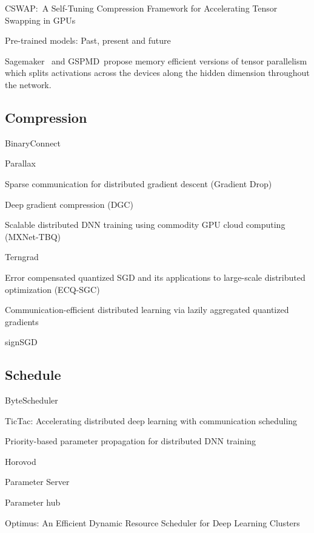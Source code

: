 CSWAP:\ A Self-Tuning Compression Framework for Accelerating Tensor Swapping in GPUs~\cite{chen2021cswap}

Pre-trained models: Past, present and future~\cite{han2021pre}

Sagemaker~\cite{karakus2021amazon} and GSPMD~\cite{xu2021gspmd}propose memory efficient versions of tensor parallelism which splits activations across the devices along the hidden dimension throughout the network.





\subsection{Compression}
BinaryConnect~\cite{courbariaux2015binaryconnect}

Parallax~\cite{kim2019parallax}

Sparse communication for distributed gradient descent (Gradient Drop)~\cite{aji2017sparse}

Deep gradient compression (DGC)~\cite{lin2017deep}

Scalable distributed DNN training using commodity GPU cloud computing (MXNet-TBQ)~\cite{strom2015scalable}

Terngrad~\cite{wen2017terngrad}

Error compensated quantized SGD and its applications to large-scale distributed optimization (ECQ-SGC)~\cite{wu2018error}

Communication-efficient distributed learning via lazily aggregated quantized gradients~\cite{sun2019communication}

signSGD~\cite{bernstein2018signsgd}

\subsection{Schedule}

ByteScheduler~\cite{peng2019bytescheduler}

TicTac: Accelerating distributed deep learning with communication scheduling~\cite{hashemi2018tictac}

Priority-based parameter propagation for distributed DNN training~\cite{jayarajan2019priority}

Horovod~\cite{horovod}

Parameter Server~\cite{li2013parameter}

Parameter hub~\cite{luo2018parameter}

Optimus: An Efficient Dynamic Resource Scheduler for Deep Learning Clusters~\cite{Peng2018Optimus}

